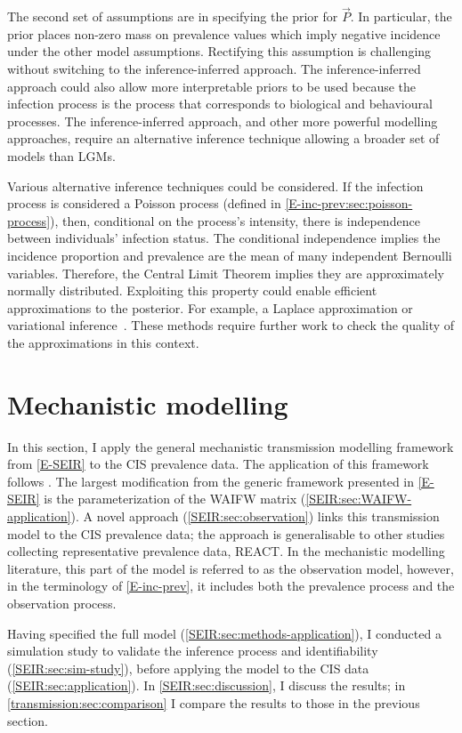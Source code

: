 \documentclass[thesis.tex]{subfiles}
\begin{document}
The second set of assumptions are in specifying the prior for $\vec{P}$.
In particular, the prior places non-zero mass on prevalence values which imply negative incidence under the other model assumptions.
Rectifying this assumption is challenging without switching to the inference-inferred approach.
The inference-inferred approach could also allow more interpretable priors to be used because the infection process is the process that corresponds to biological and behavioural processes.
The inference-inferred approach, and other more powerful modelling approaches, require an alternative inference technique allowing a broader set of models than LGMs.

Various alternative inference techniques could be considered.
If the infection process is considered a Poisson process (defined in \cref{E-inc-prev:sec:poisson-process}), then, conditional on the process's intensity, there is independence between individuals' infection status.
The conditional independence implies the incidence proportion and prevalence are the mean of many independent Bernoulli variables.
Therefore, the Central Limit Theorem implies they are approximately normally distributed.
Exploiting this property could enable efficient approximations to the posterior.
For example, a Laplace approximation or variational inference~\autocite{bleiVariational}.
These methods require further work to check the quality of the approximations in this context.


\section{Mechanistic modelling} \label{SEIR}

In this section, I apply the general mechanistic transmission modelling framework from \cref{E-SEIR} to the CIS prevalence data.
The application of this framework follows \textcite{birrellRealtime}.
The largest modification from the generic framework presented in \cref{E-SEIR} is the parameterization of the WAIFW matrix (\cref{SEIR:sec:WAIFW-application}).
A novel approach (\cref{SEIR:sec:observation}) links this transmission model to the CIS prevalence data; the approach is generalisable to other studies collecting representative prevalence data, \eg REACT.
In the mechanistic modelling literature, this part of the model is referred to as the observation model, however, in the terminology of \cref{E-inc-prev}, it includes both the prevalence process and the observation process.

Having specified the full model (\cref{SEIR:sec:methods-application}), I conducted a simulation study to validate the inference process and identifiability (\cref{SEIR:sec:sim-study}), before applying the model to the CIS data (\cref{SEIR:sec:application}).
In \cref{SEIR:sec:discussion}, I discuss the results; in \cref{transmission:sec:comparison} I compare the results to those in the previous section.
\end{document}

